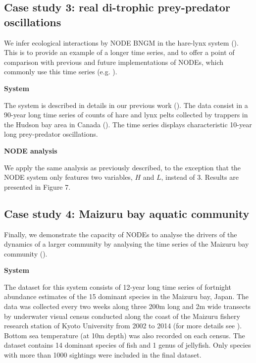 \documentclass[11pt, oneside]{article}
\begin{document}
\subsection{Case study 3: real di-trophic prey-predator oscillations}

We infer ecological interactions by NODE BNGM in the hare-lynx system (\cite{Odum1972}).
This is to provide an example of a longer time series, and to offer a point of comparison with previous and future implementations of NODEs, which commonly use this time series (e.g. \cite{Bonnaffe2021a,Frank2022}).

\textbf{System}

The system is described in details in our previous work (\cite{Bonnaffe2021a}).
The data consist in a 90-year long time series of counts of hare and lynx pelts collected by trappers in the Hudson bay area in Canada (\cite{Odum1972}).
The time series displays characteristic 10-year long prey-predator oscillations.

\textbf{NODE analysis}

We apply the same analysis as previously described, to the exception that the NODE system only features two variables, $H$ and $L$, instead of 3.
Results are presented in Figure 7.

\subsection{Case study 4: Maizuru bay aquatic community}

Finally, we demonstrate the capacity of NODEs to analyse the drivers of the dynamics of a larger community by analysing the time series of the Maizuru bay community (\cite{Ushio2018}).

\textbf{System}

The dataset for this system consists of 12-year long time series of fortnight abundance estimates of the 15 dominant species in the Maizuru bay, Japan. 
The data was collected every two weeks along three 200m long and 2m wide transects by underwater visual census conducted along the coast of the Maizuru fishery research station of Kyoto University from 2002 to 2014 (for more details see \cite{Ushio2018}).
Bottom sea temperature (at 10m depth) was also recorded on each census.
The dataset contains 14 dominant species of fish and 1 genus of jellyfish.
Only species with more than 1000 sightings were included in the final dataset. 
\end{document}

